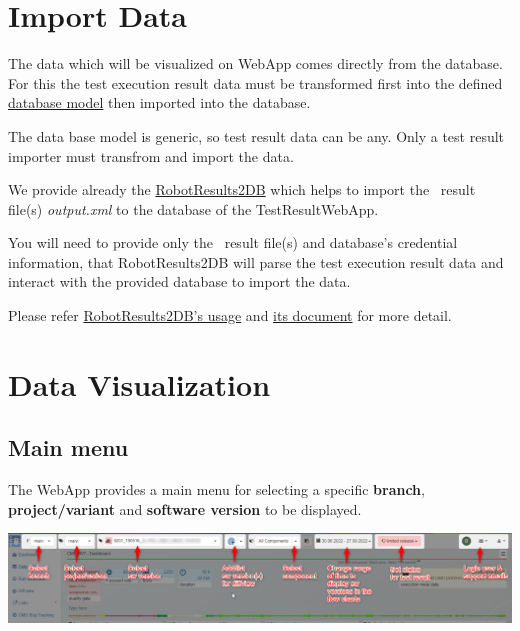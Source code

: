 \hypertarget{import-data}{%
\section{Import Data}\label{import-data}}

The data which will be visualized on WebApp comes directly from the database.
For this the test execution result data must be transformed first 
into the defined \href{https://github.com/test-fullautomation/testresultwebapp/blob/develop/TestResultWebApp/mysql_server/datamodel/datamodel.svg}{database model} 
then imported into the database.

The data base model is generic, so test result data can be any. Only a test 
result importer must transfrom and import the data.

We provide already the \href{https://github.com/test-fullautomation/robotframework-testresultwebapptool}{RobotResults2DB}
which helps to import the \rfwcore\ result file(s) \emph{output.xml} to the 
database of the TestResultWebApp.

You will need to provide only the \rfwcore\ result file(s) and database's 
credential information, that RobotResults2DB will parse the test execution result data 
and interact with the provided database to import the data.

Please refer \href{https://github.com/test-fullautomation/robotframework-testresultwebapptool#usage}{RobotResults2DB's usage} and 
\href{https://github.com/test-fullautomation/robotframework-testresultwebapptool/blob/develop/RobotResults2DB/RobotResults2DB.pdf}
{its document} for more detail.


\hypertarget{data-visualization}{%
\section{Data Visualization}\label{data-visualization}}

\hypertarget{main-menu}{%
\subsection{Main menu}\label{main-menu}}
The WebApp provides a main menu for selecting a specific \textbf{branch}, 
\textbf{project/variant} and \textbf{software version} to be displayed.

\includegraphics[width=1\linewidth]{./pictures/main-menu.png}


